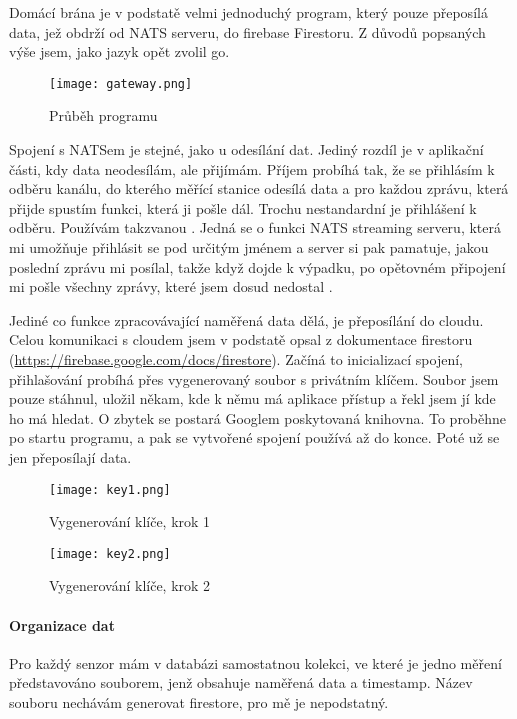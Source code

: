Domácí brána je v podstatě velmi jednoduchý program, který pouze přeposílá data, jež obdrží od NATS serveru, do 
\gls{firebase} Firestoru. Z důvodů popsaných výše jsem, jako jazyk opět zvolil \gls{go}.

\begin{figure}[H]
		\centering
    \texttt{[image: gateway.png]}
    \caption{Průběh programu}
\end{figure}

Spojení s NATSem je stejné, jako u odesílání dat. Jediný rozdíl je v aplikační části, kdy data neodesílám, ale přijímám. 
Příjem probíhá tak, že se přihlásím k odběru kanálu, do kterého měřící stanice odesílá data a pro každou zprávu, která 
přijde spustím funkci, která ji pošle dál. Trochu nestandardní je přihlášení k odběru. Používám takzvanou . Jedná se o funkci NATS streaming serveru, která mi umožňuje přihlásit se pod určitým jménem a server si 
pak pamatuje, jakou poslední zprávu mi posílal, takže když dojde k výpadku, po opětovném připojení mi pošle všechny 
zprávy, které jsem dosud nedostal \parencite{root.cz:NATS-streaming}.

Jediné co funkce zpracovávající naměřená data dělá, je přeposílání do cloudu. Celou komunikaci s cloudem jsem v podstatě 
opsal z dokumentace firestoru (\url{https://firebase.google.com/docs/firestore}). Začíná to inicializací spojení, 
přihlašování probíhá přes vygenerovaný soubor s privátním klíčem. Soubor jsem pouze stáhnul, uložil někam, kde k němu má 
aplikace přístup a řekl jsem jí kde ho má hledat. O zbytek se postará Googlem poskytovaná \gls{knihovna}. To proběhne po 
startu programu, a pak se vytvořené spojení používá až do konce. Poté už se jen přeposílají data.

\begin{figure}[H]
    \centering
    \texttt{[image: key1.png]}
    \caption{Vygenerování klíče, krok 1}
\end{figure}
\begin{figure}[H]
    \centering
    \texttt{[image: key2.png]}
    \caption{Vygenerování klíče, krok 2}
\end{figure}

\paragraph*{Organizace dat}
Pro každý senzor mám v databázi samostatnou kolekci, ve které je jedno měření představováno souborem, jenž obsahuje 
naměřená data a \gls{timestamp}. Název souboru nechávám generovat firestore, pro mě je nepodstatný.

